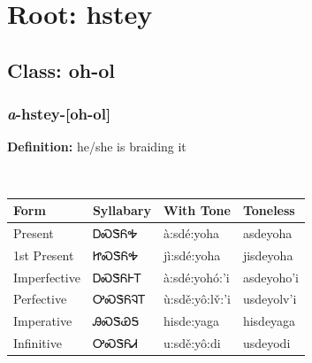 \needspace{4in}
\section*{Root: hstey}
\nopagebreak
{}
\needspace{3in}
\subsection*{Class: oh-ol}
\nopagebreak
\needspace{2in}
\subsubsection*{\textit{a}{-}\textbf{hstey}{-}[oh-ol]}
\nopagebreak
\textbf{Definition: } he/she is braiding it
\\[0.5em]
\begin{tabularx}{\textwidth}{l X X X}%
\toprule%
\textbf{Form}&\textbf{Syllabary}&\textbf{With Tone}&\textbf{Toneless}\\%
\midrule%
Present&ᎠᏍᏕᏲᎭ&à:sdé:yoha&asdeyoha\\%
1st Present&ᏥᏍᏕᏲᎭ&jì:sdé:yoha&jisdeyoha\\%
Imperfective&ᎠᏍᏕᏲᎰᎢ&à:sdé:yohó:’i&asdeyoho’i\\%
Perfective&ᎤᏍᏕᏲᎸᎢ&ù:sdě:yô:lv̌:’i&usdeyolv’i\\%
Imperative&ᎯᏍᏕᏯᎦ&hisde:yaga&hisdeyaga\\%
Infinitive&ᎤᏍᏕᏲᏗ&u:sdě:yô:di&usdeyodi\\%
\bottomrule%
\end{tabularx}
\\[1em]